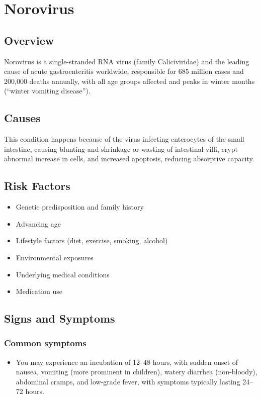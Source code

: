 \chapter{Norovirus}
\label{sec:Norovirus}

\section{Overview}
Norovirus is a single-stranded RNA virus (family Caliciviridae) and the leading cause of acute gastroenteritis worldwide, responsible for 685 million cases and 200,000 deaths annually, with all age groups affected and peaks in winter months (``winter vomiting disease'').
\section{Causes}
This condition happens because of the virus infecting enterocytes of the small intestine, causing blunting and shrinkage or wasting of intestinal villi, crypt abnormal increase in cells, and increased apoptosis, reducing absorptive capacity.     
\section{Risk Factors}

\begin{itemize}[noitemsep]
  \item Genetic predisposition and family history
  \item Advancing age
  \item Lifestyle factors (diet, exercise, smoking, alcohol)
  \item Environmental exposures
  \item Underlying medical conditions
  \item Medication use
\end{itemize}
\section{Signs and Symptoms}

\subsection{Common symptoms}
\begin{itemize}[noitemsep]
  \item You may experience an incubation of 12--48 hours, with sudden onset of nausea, vomiting (more prominent in children), watery diarrhea (non-bloody), abdominal cramps, and low-grade fever, with symptoms typically lasting 24--72 hours. 
  \end{itemize}

